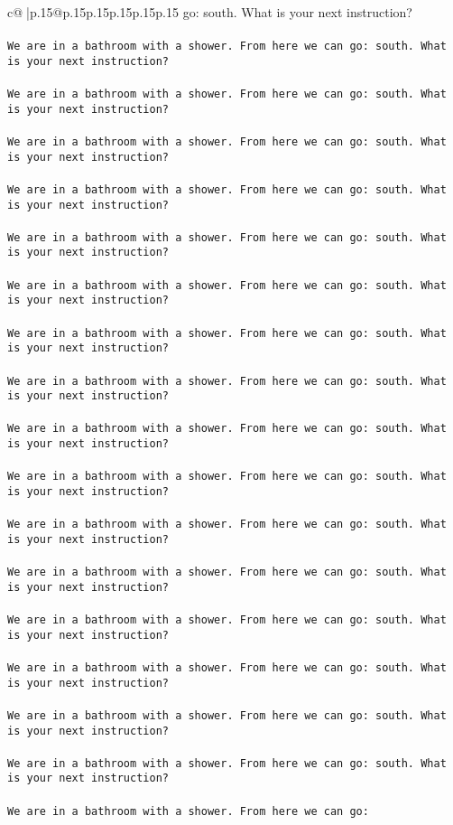 \documentclass{article}
\begin{document}
{\begin{supertabular}{c@{$\;$}|p{.15\linewidth}@{}p{.15\linewidth}p{.15\linewidth}p{.15\linewidth}p{.15\linewidth}p{.15\linewidth}}
{{{go: south. What is your next instruction?\\ \tt \\ \tt We are in a bathroom with a shower. From here we can go: south. What is your next instruction?\\ \tt \\ \tt We are in a bathroom with a shower. From here we can go: south. What is your next instruction?\\ \tt \\ \tt We are in a bathroom with a shower. From here we can go: south. What is your next instruction?\\ \tt \\ \tt We are in a bathroom with a shower. From here we can go: south. What is your next instruction?\\ \tt \\ \tt We are in a bathroom with a shower. From here we can go: south. What is your next instruction?\\ \tt \\ \tt We are in a bathroom with a shower. From here we can go: south. What is your next instruction?\\ \tt \\ \tt We are in a bathroom with a shower. From here we can go: south. What is your next instruction?\\ \tt \\ \tt We are in a bathroom with a shower. From here we can go: south. What is your next instruction?\\ \tt \\ \tt We are in a bathroom with a shower. From here we can go: south. What is your next instruction?\\ \tt \\ \tt We are in a bathroom with a shower. From here we can go: south. What is your next instruction?\\ \tt \\ \tt We are in a bathroom with a shower. From here we can go: south. What is your next instruction?\\ \tt \\ \tt We are in a bathroom with a shower. From here we can go: south. What is your next instruction?\\ \tt \\ \tt We are in a bathroom with a shower. From here we can go: south. What is your next instruction?\\ \tt \\ \tt We are in a bathroom with a shower. From here we can go: south. What is your next instruction?\\ \tt \\ \tt We are in a bathroom with a shower. From here we can go: south. What is your next instruction?\\ \tt \\ \tt We are in a bathroom with a shower. From here we can go: south. What is your next instruction?\\ \tt \\ \tt We are in a bathroom with a shower. From here we can go: }}}
\end{supertabular}}
\end{document}
